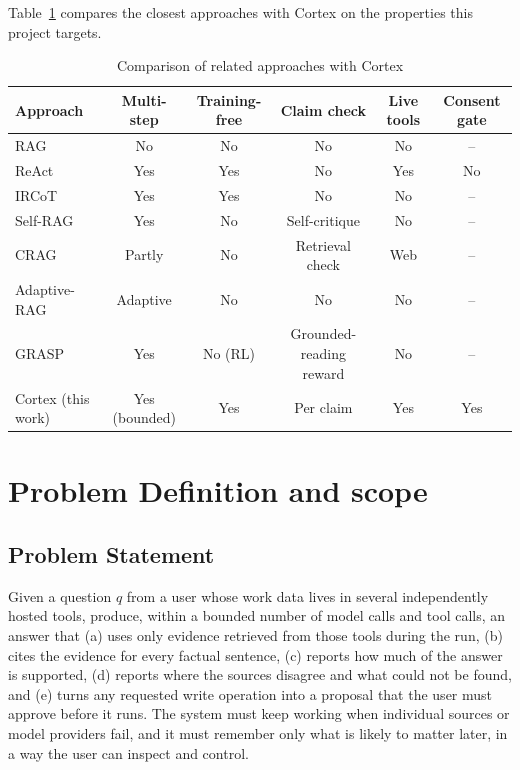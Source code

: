 Table~\ref{tab:litcompare} compares the closest approaches with Cortex on the properties this project targets.

\begin{table}[!htbp]
\begin{center}
\def\arraystretch{1.3}
\small
\begin{tabularx}{\textwidth}{| X | c | c | c | c | c |}
\hline
Approach & Multi-step & Training-free & Claim check & Live tools & Consent gate \\ \hline
RAG~\cite{lewis2020rag} & No & No & No & No & -- \\ \hline
ReAct~\cite{yao2023react} & Yes & Yes & No & Yes & No \\ \hline
IRCoT~\cite{trivedi2023ircot} & Yes & Yes & No & No & -- \\ \hline
Self-RAG~\cite{asai2024selfrag} & Yes & No & Self-critique & No & -- \\ \hline
CRAG~\cite{yan2024crag} & Partly & No & Retrieval check & Web & -- \\ \hline
Adaptive-RAG~\cite{jeong2024adaptiverag} & Adaptive & No & No & No & -- \\ \hline
GRASP~\cite{grasp2026} & Yes & No (RL) & Grounded-reading reward & No & -- \\ \hline
Cortex (this work) & Yes (bounded) & Yes & Per claim & Yes & Yes \\ \hline
\end{tabularx}
\end{center}
\caption{Comparison of related approaches with Cortex}
\label{tab:litcompare}
\end{table}


\chapter{Problem Definition and scope}
\section{Problem Statement}
Given a question $q$ from a user whose work data lives in several independently hosted tools, produce, within a bounded number of model calls and tool calls, an answer that (a) uses only evidence retrieved from those tools during the run, (b) cites the evidence for every factual sentence, (c) reports how much of the answer is supported, (d) reports where the sources disagree and what could not be found, and (e) turns any requested write operation into a proposal that the user must approve before it runs. The system must keep working when individual sources or model providers fail, and it must remember only what is likely to matter later, in a way the user can inspect and control.


